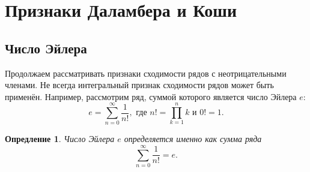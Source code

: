 \documentclass[12pt]{article}
\newtheorem{definition}{Опредление}[section]
\begin{document}
\section{Признаки Даламбера и Коши}
\subsection{Число Эйлера}
Продолжаем рассматривать признаки сходимости рядов с неотрицательными членами. Не всегда интегральный признак сходимости рядов может быть применён. Например, рассмотрим ряд, суммой которого является число Эйлера $e$:
\begin{equation}
    e = \sum\limits_{n=0}^\infty \dfrac{1}{n!},\text{ где } n! = \prod\limits_{k=1}^n k\text{ и }0! = 1.
\end{equation}
\begin{definition}
Число Эйлера $e$ определяется именно как сумма ряда
\begin{equation}
    \sum\limits_{n=0}^\infty \dfrac{1}{n!} = e.
\end{equation}
\end{definition}
\end{document}
